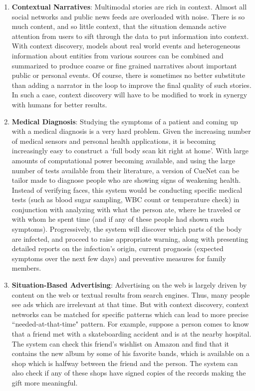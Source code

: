 \begin{enumerate}
  \item \textbf{Contextual Narratives}: Multimodal stories are rich in context. Almost all social networks and public news feeds are overloaded with noise. There is so much content, and so little context, that the situation demands active attention from users to sift through the data to put information into context. With context discovery, models about real world events and heterogeneous information about entities from various sources can be combined and summarized to produce coarse or fine grained narratives about important public or personal events. Of course, there is sometimes no better substitute than adding a narrator in the loop to improve the final quality of such stories. In such a case, context discovery will have to be modified to work in synergy with humans for better results.

  \item \textbf{Medical Diagnosis}: Studying the symptoms of a patient and coming up with a medical diagnosis is a very hard problem. Given the increasing number of medical sensors and personal health applications, it is becoming increasingly easy to construct a `full body scan kit right at home'. With large amounts of computational power becoming available, and using the large number of tests available from their literature, a version of CueNet can be tailor made to diagnose people who are showing signs of weakening health. Instead of verifying faces, this system would be conducting specific medical tests (such as blood sugar sampling, WBC count or temperature check) in conjunction with analyzing with what the person ate, where he traveled or with whom he spent time (and if any of these people had shown such symptoms). Progressively, the system will discover which parts of the body are infected, and proceed to raise appropriate warning, along with presenting detailed reports on the infection's origin, current prognosis (expected symptoms over the next few days) and preventive measures for family members.

  \item \textbf{Situation-Based Advertising}: Advertising on the web is largely driven by content on the web or textual results from search engines. Thus, many people see ads which are irrelevant at that time. But with context discovery, context networks can be matched for specific patterns which can lead to more precise ``needed-at-that-time" pattern. For example, suppose a person comes to know that a friend met with a skateboarding accident and is at the nearby hospital. The system can check this friend's wishlist on Amazon and find that it contains the new album by some of his favorite bands, which is available on a shop which is halfway between the friend and the person. The system can also check if any of these shops have signed copies of the records making the gift more meaningful.


\end{enumerate}

